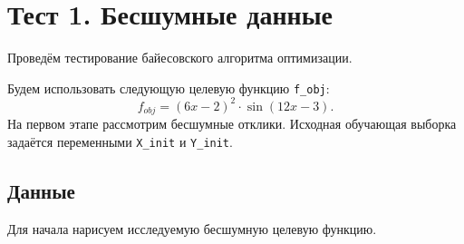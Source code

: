 \documentclass[11pt,a4paper]{article}
\begin{document}

    \hypertarget{ux442ux435ux441ux442-1.-ux431ux435ux441ux448ux443ux43cux43dux44bux435-ux434ux430ux43dux43dux44bux435}{%
\section{Тест 1. Бесшумные
данные}\label{ux442ux435ux441ux442-1.-ux431ux435ux441ux448ux443ux43cux43dux44bux435-ux434ux430ux43dux43dux44bux435}}

    Проведём тестирование байесовского алгоритма оптимизации.

Будем использовать следующую целевую функцию \texttt{f\_obj}: \[
  f_{obj} = (6x-2)^2 \cdot \sin\left(12x-3\right).
\]
На первом этапе рассмотрим бесшумные отклики. Исходная обучающая выборка
задаётся переменными \texttt{X\_init} и \texttt{Y\_init}.

    \hypertarget{ux434ux430ux43dux43dux44bux435}{%
\subsection{Данные}\label{ux434ux430ux43dux43dux44bux435}}

    Для начала нарисуем исследуемую бесшумную целевую функцию.
\end{document}
